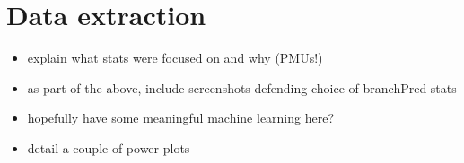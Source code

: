 \section{Data extraction}

\begin{itemize}
    \item explain what stats were focused on and why (PMUs!)
    \item as part of the above, include screenshots defending choice of 
          branchPred stats
    \item hopefully have some meaningful machine learning here?
    \item detail a couple of power plots
\end{itemize}